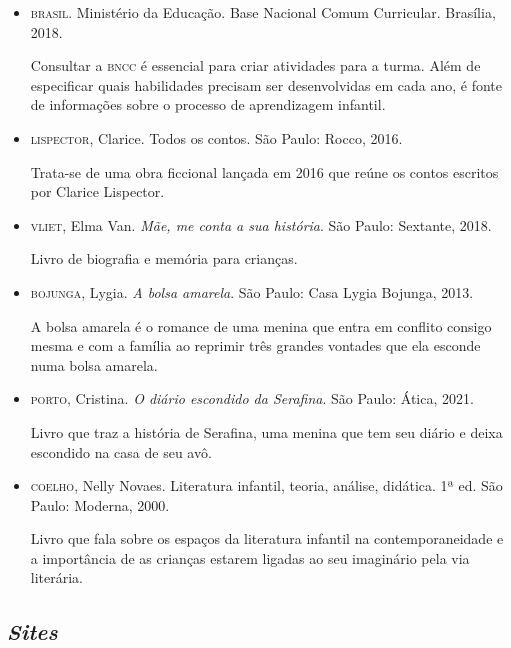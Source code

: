\documentclass[11pt]{extarticle}
\begin{document}
\begin{itemize}
\item \textsc{brasil}. Ministério da Educação. Base Nacional Comum Curricular. Brasília, 2018.

Consultar a \textsc{bncc} é essencial para criar atividades para a turma. Além de especificar quais habilidades precisam ser desenvolvidas em cada ano, é fonte de informações sobre o processo de aprendizagem infantil. 

\item \textsc{lispector}, Clarice. Todos os contos. São Paulo: Rocco, 2016.

Trata-se de uma obra ficcional lançada em 2016 que reúne os contos escritos por Clarice Lispector. 
 
\item \textsc{vliet}, Elma Van. \textit{Mãe, me conta a sua história}. São Paulo: Sextante, 2018.

Livro de biografia e memória para crianças.

\item \textsc{bojunga}, Lygia. \textit{A bolsa amarela}. São Paulo: Casa Lygia Bojunga, 2013.

A bolsa amarela é o romance de uma menina que entra em conflito consigo mesma e com a família ao reprimir três grandes vontades que ela esconde numa bolsa amarela.


\item \textsc{porto}, Cristina. \textit{O diário escondido da Serafina}. São Paulo: Ática, 2021.

Livro que traz a história de Serafina, uma menina que tem seu diário e deixa escondido na casa de seu avô.

\item \textsc{coelho}, Nelly Novaes. Literatura infantil, teoria, análise, didática. 1ª ed. São Paulo: Moderna, 2000.

Livro que fala sobre os espaços da literatura infantil na contemporaneidade e a importância de as crianças estarem ligadas ao seu imaginário pela via literária.

\end{itemize}

\subsection{\textit{Sites}}
\end{document}
